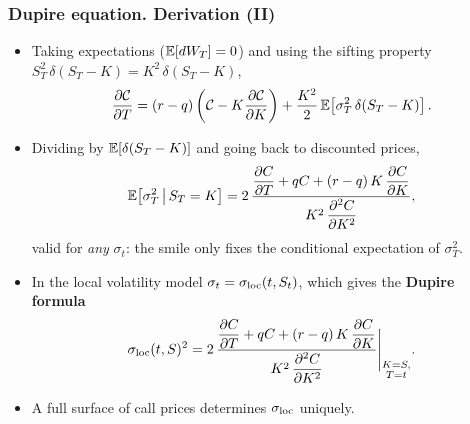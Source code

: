 \begin{frame}
\frametitle{Dupire equation. Derivation (II)}
\begin{scriptsize}
\begin{itemize}
\item Taking expectations ($\mathbb{E}[dW_T] = 0$) and using the sifting property $S_T^2\,\delta(S_T - K) = K^2\,\delta(S_T - K)$,
\begin{equation*}
    \frac{\partial \mathcal{C}}{\partial T}
    = (r-q)\left(\mathcal{C} - K\frac{\partial \mathcal{C}}{\partial K}\right)
    + \frac{K^2}{2}\,\mathbb{E}\!\left[\sigma_T^2\,\delta(S_T - K)\right].
\end{equation*}
\item Dividing by $\mathbb{E}[\delta(S_T - K)]$ and going back to discounted prices,
\begin{equation*}
    \mathbb{E}\!\left[\sigma_T^2 \,\middle|\, S_T = K\right]
    = 2\,\frac{\dfrac{\partial C}{\partial T} + qC + (r-q)\,K\,\dfrac{\partial C}{\partial K}}
           {K^2\,\dfrac{\partial^2 C}{\partial K^2}},
\end{equation*}
valid for \emph{any} $\sigma_t$: the smile only fixes the conditional expectation of $\sigma_T^2$.

\item In the local volatility model $\sigma_t = \sigma_{\mathrm{loc}}(t, S_t)$, which gives the \textbf{Dupire formula}
\begin{equation*}
    \sigma_{\mathrm{loc}}(t, S)^2 = 2\,\frac{
        \dfrac{\partial C}{\partial T} + qC + (r-q)\,K\,\dfrac{\partial C}{\partial K}
    }{
        K^2\,\dfrac{\partial^2 C}{\partial K^2}
    }\Bigg|_{\substack{K = S,\\ T = t}}.
\end{equation*}
\item A full surface of call prices determines $\sigma_{\mathrm{loc}}$ uniquely.
\end{itemize}
\end{scriptsize}
\end{frame}

